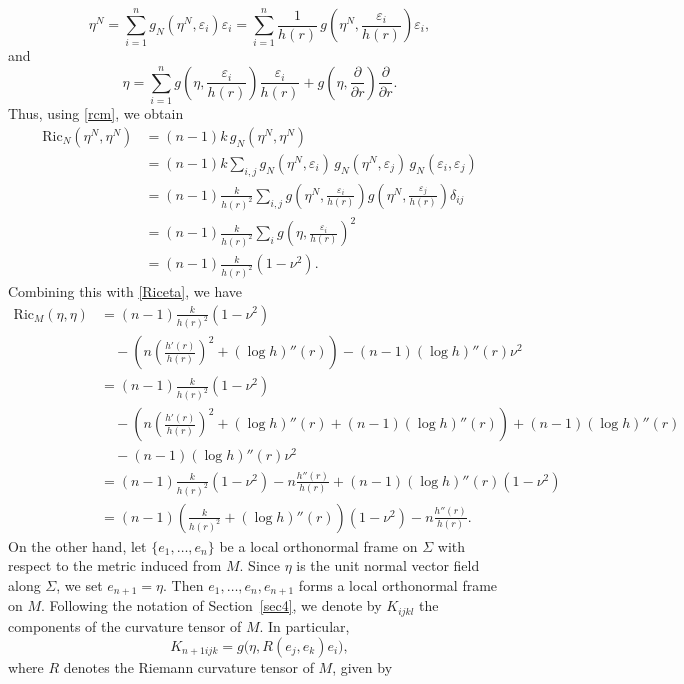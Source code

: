 \documentclass[amssymb,amstex,amsmath,11pt]{article}
\numberwithin{equation}{section}
\renewcommand{\epsilon}{\varepsilon}
\theoremstyle{plain}
\theoremstyle{definition}
\theoremstyle{remark}
\def\Ricm{\textrm{Ric}_M}
\def\Ric{\textrm{Ric}}
\begin{document}
$$
\eta^N=\sum_{i=1}^n g_N(\eta^N,\epsilon_i)\epsilon_i
      =\sum_{i=1}^n \frac{1}{h(r)}\,g\!\left(\eta^N,\frac{\epsilon_i}{h(r)}\right)\epsilon_i,
$$
and
$$
\eta=\sum_{i=1}^n g\!\left(\eta,\frac{\epsilon_i}{h(r)}\right)\frac{\epsilon_i}{h(r)}
     +g\!\left(\eta,\frac{\partial}{\partial r}\right)\frac{\partial}{\partial r}.
$$
Thus, using \eqref{rcm}, we obtain
\begin{align*}
\Ric_N(\eta^N,\eta^N)
&= (n-1)k\, g_N(\eta^N,\eta^N) \\
&= (n-1)k \sum_{i,j} g_N(\eta^N,\epsilon_i)\, g_N(\eta^N,\epsilon_j)\, g_N(\epsilon_i,\epsilon_j) \\
&= (n-1)\frac{k}{h(r)^2}\sum_{i,j}
g\!\left(\eta^N,\frac{\epsilon_i}{h(r)}\right)
g\!\left(\eta^N,\frac{\epsilon_j}{h(r)}\right)\delta_{ij} \\
&= (n-1)\frac{k}{h(r)^2}\sum_i
g\!\left(\eta,\frac{\epsilon_i}{h(r)}\right)^2 \\
&= (n-1)\frac{k}{h(r)^2}(1-\nu^2).
\end{align*}
Combining this with \eqref{Riceta}, we have
\begin{align}\label{ric}
    \Ricm(\eta,\eta)
    & = (n-1)\frac{k}{h(r)^2}(1-\nu^2) \nonumber \\
    & \quad
    - \left(n\left(\frac{h'(r)}{h(r)}\right)^2+(\log h)''(r)\right) - (n-1)(\log h)''(r)\nu^2 \nonumber \\
    & = (n-1)\frac{k}{h(r)^2}(1-\nu^2) \nonumber \\
    & \quad -\left(n\left(\frac{h'(r)}{h(r)}\right)^2+(\log h)''(r)+(n-1)(\log h)''(r)\right) + (n-1)(\log h)''(r) \nonumber\\
    & \quad -(n-1)(\log h)''(r)\nu^2 \nonumber\\
    & = (n-1)\frac{k}{h(r)^2}(1-\nu^2) - n\frac{h''(r)}{h(r)} + (n-1)(\log h)''(r)(1-\nu^2)\nonumber \\
    & = (n-1)\left(\frac{k}{h(r)^2} + (\log h)''(r)\right)(1-\nu^2) - n\frac{h''(r)}{h(r)}.
\end{align}
On the other hand, let $\{e_1,\ldots,e_n\}$ be a local orthonormal frame on $\Sigma$ with respect to the metric induced from $M$. Since $\eta$ is the unit normal vector field along $\Sigma$, we set $e_{n+1}=\eta$. Then ${e_1,\ldots,e_n,e_{n+1}}$ forms a local orthonormal frame on $M$. Following the notation of Section~\ref{sec4}, we denote by $K_{ijkl}$ the components of the curvature tensor of $M$. In particular,
$$
K_{n+1ijk}=g\bigl(\eta,R(e_j,e_k)e_i\bigr),
$$
where $R$ denotes the Riemann curvature tensor of $M$, given by
\end{document}
